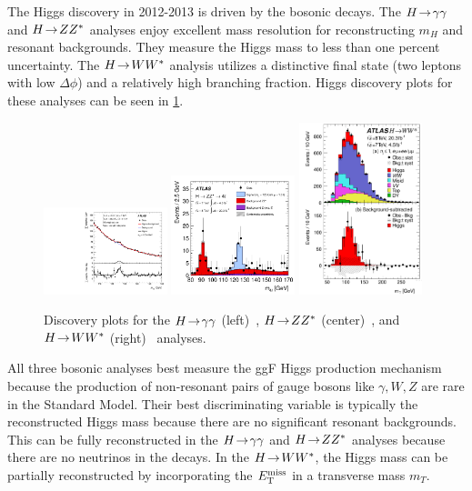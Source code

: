 The Higgs discovery in 2012-2013 is driven by the bosonic decays. The $H \!\rightarrow\! \gamma\gamma$ and $H \!\rightarrow\! ZZ^\ast$ analyses enjoy excellent mass resolution for reconstructing $m_H$ and resonant backgrounds. They measure the Higgs mass to less than one percent uncertainty. The $H \!\rightarrow\! WW^\ast$ analysis utilizes a distinctive final state (two leptons with low $\Delta\phi$) and a relatively high branching fraction. Higgs discovery plots for these analyses can be seen in \cref{fig:strategy-higgs-yyzzww}.

\begin{figure}[tp]
  \centering
  \includegraphics[width=0.32\textwidth]{figures/HIGG-2013-08/fig_13}
  \includegraphics[width=0.32\textwidth]{figures/HIGG-2013-21/fig_13a}
  \includegraphics[width=0.32\textwidth]{figures/HIGG-2013-13/fig_35}
  \caption{Discovery plots for the $H \!\rightarrow\! \gamma\gamma$ (left)~\cite{HIGG-2013-08}, $H \!\rightarrow\! ZZ^\ast$ (center)~\cite{HIGG-2013-21}, and $H \!\rightarrow\! WW^\ast$ (right)~\cite{HIGG-2013-13} analyses.}
  \label{fig:strategy-higgs-yyzzww}
\end{figure}

All three bosonic analyses best measure the ggF Higgs production mechanism because the production of non-resonant pairs of gauge bosons like $\gamma, W, Z$ are rare in the Standard Model. Their best discriminating variable is typically the reconstructed Higgs mass because there are no significant resonant backgrounds. This can be fully reconstructed in the $H \!\rightarrow\! \gamma\gamma$ and $H \!\rightarrow\! ZZ^\ast$ analyses because there are no neutrinos in the decays. In the $H \!\rightarrow\! WW^\ast$, the Higgs mass can be partially reconstructed by incorporating the $E_{\mathrm{T}}^{\mathrm{miss}}$ in a transverse mass $m_T$.

